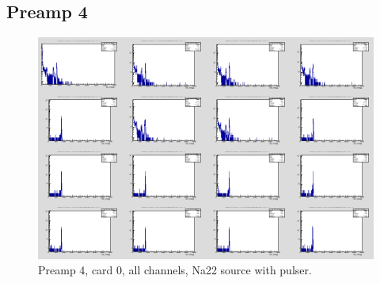 \documentclass{report}
\begin{document}
\subsection{Preamp 4}
\begin{figure}[!htb]
  \includegraphics[width=\linewidth]{preamp4_lim_energy_card0_all.png}
  \caption{Preamp 4, card 0, all channels, Na22 source  with pulser.}
\end{figure}
\end{document}
